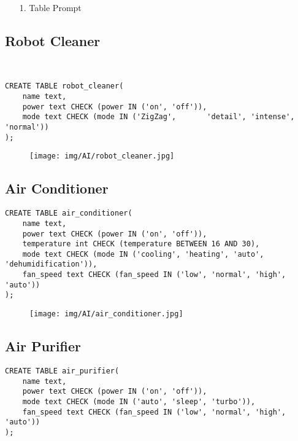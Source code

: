 \documentclass[conference]{IEEEtran}
\begin{document}
\begin{itemize}
    \item[1.] Table Prompt
\end{itemize}

\subsection*{Robot Cleaner}
\\
\begin{lstlisting}
CREATE TABLE robot_cleaner(
    name text,
    power text CHECK (power IN ('on', 'off')),
    mode text CHECK (mode IN ('ZigZag',       'detail', 'intense', 'normal'))
);
\end{lstlisting}
\begin{figure}[h]
\hspace{1.5cm}
\centering
\begin{minipage}{0.8\columnwidth}
    \texttt{[image: img/AI/robot\_cleaner.jpg]}
\end{minipage}
\end{figure}

\subsection*{Air Conditioner}
\begin{lstlisting}
CREATE TABLE air_conditioner(
    name text,
    power text CHECK (power IN ('on', 'off')),
    temperature int CHECK (temperature BETWEEN 16 AND 30),
    mode text CHECK (mode IN ('cooling', 'heating', 'auto', 'dehumidification')),
    fan_speed text CHECK (fan_speed IN ('low', 'normal', 'high', 'auto'))
);
\end{lstlisting}

\begin{figure}[h]
\hspace{1.5cm}
\centering
\begin{minipage}{0.8\columnwidth}
    \texttt{[image: img/AI/air\_conditioner.jpg]}
\end{minipage}
\end{figure}

\clearpage

\subsection*{Air Purifier}
\begin{lstlisting}
CREATE TABLE air_purifier(
    name text,
    power text CHECK (power IN ('on', 'off')),
    mode text CHECK (mode IN ('auto', 'sleep', 'turbo')),
    fan_speed text CHECK (fan_speed IN ('low', 'normal', 'high', 'auto'))
);
\end{lstlisting}
\end{document}
